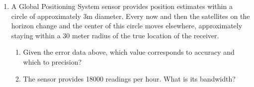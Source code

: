 \documentclass[letter,twoside,11pt]{article}
\begin{document}
\begin{enumerate}
\item A Global Positioning System sensor provides position estimates within a circle of approximately 3m diameter. Every now and then the satellites on the horizon change and the center of this circle moves elsewhere, approximately staying within a 30 meter radius of the true location of the receiver.
\begin{enumerate}
\item Given the error data above, which value corresponds to accuracy and which to precision?
\item The sensor provides 18000 readings per hour. What is its bandwidth?
\end{enumerate}

\end{enumerate}





\end{document}
